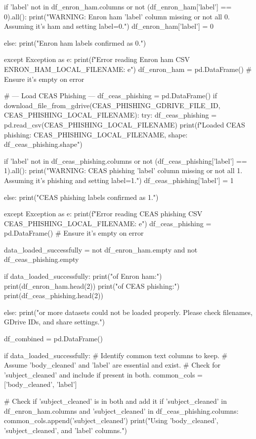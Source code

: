 \begin{ffcode}
        if 'label' not in df_enron_ham.columns or not (df_enron_ham['label'] == 0).all():
            print("WARNING: Enron ham 'label' column missing or not all 0. Assuming it's ham and setting label=0.")
            df_enron_ham['label'] = 0

        else:
            print("Enron ham labels confirmed as 0.")

    except Exception as e:
        print(f"Error reading Enron ham CSV {ENRON_HAM_LOCAL_FILENAME}: {e}")
        df_enron_ham = pd.DataFrame() # Ensure it's empty on error

# --- Load CEAS Phishing ---
df_ceas_phishing = pd.DataFrame()
if download_file_from_gdrive(CEAS_PHISHING_GDRIVE_FILE_ID, CEAS_PHISHING_LOCAL_FILENAME):
    try:
        df_ceas_phishing = pd.read_csv(CEAS_PHISHING_LOCAL_FILENAME)
        print(f"Loaded CEAS phishing: {CEAS_PHISHING_LOCAL_FILENAME}, shape: {df_ceas_phishing.shape}")

        if 'label' not in df_ceas_phishing.columns or not (df_ceas_phishing['label'] == 1).all():
            print("WARNING: CEAS phishing 'label' column missing or not all 1. Assuming it's phishing and setting label=1.")
            df_ceas_phishing['label'] = 1

        else:
            print("CEAS phishing labels confirmed as 1.")

    except Exception as e:
        print(f"Error reading CEAS phishing CSV {CEAS_PHISHING_LOCAL_FILENAME}: {e}")
        df_ceas_phishing = pd.DataFrame() # Ensure it's empty on error

data_loaded_successfully = not df_enron_ham.empty and not df_ceas_phishing.empty

if data_loaded_successfully:
    print("\nSample of Enron ham:")
    print(df_enron_ham.head(2))
    print("\nSample of CEAS phishing:")
    print(df_ceas_phishing.head(2))

else:
    print("\nOne or more datasets could not be loaded properly. Please check filenames, GDrive IDs, and share settings.")
     
df_combined = pd.DataFrame()

if data_loaded_successfully:
    # Identify common text columns to keep.
    # Assume 'body_cleaned' and 'label' are essential and exist.
    # Check for 'subject_cleaned' and include if present in both.
    common_cols = ['body_cleaned', 'label']

    # Check if 'subject_cleaned' is in both and add it
    if 'subject_cleaned' in df_enron_ham.columns and 'subject_cleaned' in df_ceas_phishing.columns:
        common_cols.append('subject_cleaned')
        print("Using 'body_cleaned', 'subject_cleaned', and 'label' columns.")


\end{ffcode}
